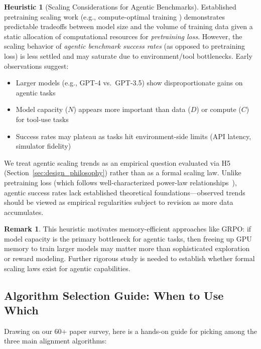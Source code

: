 \documentclass[12pt,a4paper]{report}
\theoremstyle{definition}
\newtheorem{remark}[theorem]{Remark}
\newtheorem{heuristic}[theorem]{Heuristic}
\begin{document}
\begin{heuristic}[Scaling Considerations for Agentic Benchmarks]
\label{lem:scaling}
Established pretraining scaling work (e.g., compute-optimal training \cite{hoffmann2022chinchilla}) demonstrates predictable tradeoffs between model size and the volume of training data given a static allocation of computational resources for \emph{pretraining loss}.
 However, the scaling behavior of \emph{agentic benchmark success rates} (as opposed to pretraining loss) is less settled and may saturate due to environment/tool bottlenecks. Early observations suggest:
\begin{itemize}
    \item Larger models (e.g., GPT-4 vs.\ GPT-3.5) show disproportionate gains on agentic tasks
    \item Model capacity ($N$) appears more important than data ($D$) or compute ($C$) for tool-use tasks
    \item Success rates may plateau as tasks hit environment-side limits (API latency, simulator fidelity)
\end{itemize}
We treat agentic scaling trends as an empirical question evaluated via H5 (Section~\ref{sec:design_philosophy}) rather than as a formal scaling law. Unlike pretraining loss (which follows well-characterized power-law relationships~\cite{hoffmann2022chinchilla}), agentic success rates lack established theoretical foundations---observed trends should be viewed as empirical regularities subject to revision as more data accumulates.
\end{heuristic}

\begin{remark}
This heuristic motivates memory-efficient approaches like GRPO: if model capacity is the primary bottleneck for agentic tasks, then freeing up GPU memory to train larger models may matter more than sophisticated exploration or reward modeling. Further rigorous study is needed to establish whether formal scaling laws exist for agentic capabilities.
\end{remark}

\subsection{Algorithm Selection Guide: When to Use Which}
Drawing on our 60+ paper survey, here is a hands-on guide for picking among the three main alignment algorithms:
\end{document}
